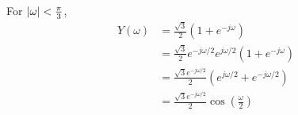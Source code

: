 \begin{enumerate}[(a)]
\begin{enumerate}[i.]
	For $\left\lvert \omega \right\rvert < \frac{\pi}{3}$,
	\begin{align*}
	Y(\omega) 
	&= \frac{\sqrt{3}}{2}(1 + e^{-j \omega}) \\
	&= \frac{\sqrt{3}}{2}e^{-j\omega / 2} e^{j\omega / 2}(1 + e^{-j\omega}) \\
	&= \frac{\sqrt{3}e^{-j\omega / 2}}{2} (e^{j\omega / 2} + e^{-j\omega/2}) \\
	&= \frac{\sqrt{3}e^{-j\omega / 2}}{2} \cos\left(\frac{\omega}{2}\right)
	\end{align*}
\end{enumerate}

\end{enumerate}